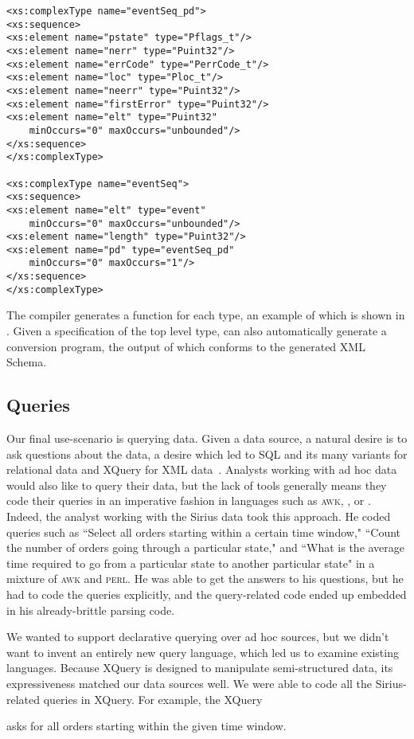 \documentclass{sig-alternate}
\newcommand{\dibbler}{Sirius}
\begin{document}
\begin{small}
\begin{verbatim}
<xs:complexType name="eventSeq_pd">
<xs:sequence>
<xs:element name="pstate" type="Pflags_t"/>
<xs:element name="nerr" type="Puint32"/>
<xs:element name="errCode" type="PerrCode_t"/>
<xs:element name="loc" type="Ploc_t"/>
<xs:element name="neerr" type="Puint32"/>
<xs:element name="firstError" type="Puint32"/>
<xs:element name="elt" type="Puint32" 
    minOccurs="0" maxOccurs="unbounded"/>
</xs:sequence>
</xs:complexType>

<xs:complexType name="eventSeq">
<xs:sequence>
<xs:element name="elt" type="event" 
    minOccurs="0" maxOccurs="unbounded"/>
<xs:element name="length" type="Puint32"/>
<xs:element name="pd" type="eventSeq_pd" 
    minOccurs="0" maxOccurs="1"/>
</xs:sequence>
</xs:complexType>
\end{verbatim} 
\end{small}
The \pads{} compiler generates a  function for each type, an example of which is shown in .  Given a specification of the top level type, \pads{} can also automatically generate a conversion program, the output of which conforms to the generated XML Schema.

\subsection{Queries}
Our final use-scenario is querying data.
Given a data source, a natural desire is to ask questions about the data, a desire which led to SQL and its many variants for relational data and XQuery for XML data~\cite{boag03XQueryDraft}.  Analysts working with ad hoc data would also like to query their
data, but the lack of tools generally means they code their queries in an imperative fashion in languages such as \textsc{awk}, \perl{}, or \C{}.
Indeed, the analyst working with the \dibbler{} data took this approach.
He coded queries such as ``Select all orders starting within a certain time window," ``Count the number of orders going through a particular state," and ``What is the average time required to go from a particular state to another
particular state" in a mixture of \textsc{awk} and \textsc{perl}.  He was
able to get the answers to his questions, but he had to code the queries explicitly, and the query-related code ended up embedded in his already-brittle parsing code.

We wanted to support declarative querying over ad hoc sources, but we didn't want to invent an entirely new query language, which led us to examine existing languages.  Because XQuery is designed to manipulate semi-structured data, its expressiveness matched our data sources well.  We were able to code all the \dibbler{}-related queries in XQuery.  For example, the XQuery
\begin{code}
\end{code}
asks for all orders starting within the given time window.  
\end{document}
